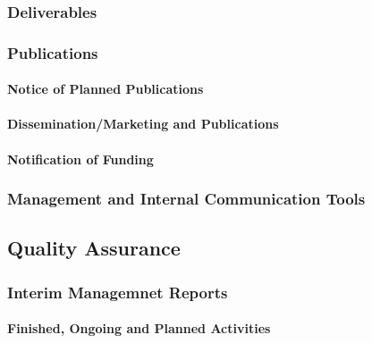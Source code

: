 \documentclass[
  11pt,
]{article}
\begin{document}
\hypertarget{deliverables}{%
\subsubsection{Deliverables}\label{deliverables}}

\hypertarget{publications}{%
\subsubsection{Publications}\label{publications}}

\hypertarget{notice-of-planned-publications}{%
\paragraph{Notice of Planned
Publications}\label{notice-of-planned-publications}}

\hypertarget{disseminationmarketing-and-publications}{%
\paragraph{Dissemination/Marketing and
Publications}\label{disseminationmarketing-and-publications}}

\hypertarget{notification-of-funding}{%
\paragraph{Notification of Funding}\label{notification-of-funding}}

\hypertarget{management-and-internal-communication-tools}{%
\subsubsection{Management and Internal Communication
Tools}\label{management-and-internal-communication-tools}}

\hypertarget{quality-assurance-1}{%
\subsection{Quality Assurance}\label{quality-assurance-1}}

\hypertarget{interim-managemnet-reports}{%
\subsubsection{Interim Managemnet
Reports}\label{interim-managemnet-reports}}

\hypertarget{finished-ongoing-and-planned-activities}{%
\paragraph{Finished, Ongoing and Planned
Activities}\label{finished-ongoing-and-planned-activities}}
\end{document}
